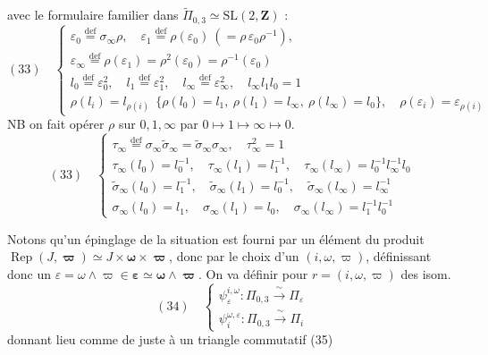 \documentclass[11pt,a4paper]{article}
\begin{document}
avec le formulaire familier dans $\widetilde{\Pi}_{0,3} \simeq \mathrm{SL}(2,\mathbf{Z})$ :
\[
  (33)\quad
  \left\{
  \begin{array}{l}
    \varepsilon_0 \overset{\mathrm{def}}{=} \sigma_\infty \rho, \quad
    \varepsilon_1 \overset{\mathrm{def}}{=} \rho(\varepsilon_0)
      \ (= \rho\, \varepsilon_0 \rho^{-1}), \\[4pt]
    \varepsilon_\infty \overset{\mathrm{def}}{=} \rho(\varepsilon_1)
      = \rho^2(\varepsilon_0) = \rho^{-1}(\varepsilon_0) \\[4pt]
    l_0 \overset{\mathrm{def}}{=} \varepsilon_0^2, \quad
    l_1 \overset{\mathrm{def}}{=} \varepsilon_1^2, \quad
    l_\infty \overset{\mathrm{def}}{=} \varepsilon_\infty^2, \quad
    l_\infty l_1 l_0 = 1 \\[4pt]
    \rho(l_i) = l_{\rho(i)}
      \ \ \{\rho(l_0) = l_1,\ \rho(l_1) = l_\infty,\ \rho(l_\infty) = l_0\}, \quad
    \rho(\varepsilon_i) = \varepsilon_{\rho(i)}
  \end{array}
  \right.
\]
NB on fait opérer $\rho$ sur $0, 1, \infty$ par $0 \mapsto 1 \mapsto \infty \mapsto 0$.
\[
  (33)\quad
  \left\{
  \begin{array}{l}
    \tau_\infty \overset{\mathrm{def}}{=} \sigma_\infty \widetilde{\sigma}_\infty
      = \widetilde{\sigma}_\infty \sigma_\infty, \quad \tau_\infty^2 = 1 \\[4pt]
    \tau_\infty(l_0) = l_0^{-1}, \quad \tau_\infty(l_1) = l_1^{-1}, \quad
    \tau_\infty(l_\infty) = l_0^{-1} l_\infty^{-1} l_0 \\[4pt]
    \widetilde{\sigma}_\infty(l_0) = l_1^{-1}, \quad
    \widetilde{\sigma}_\infty(l_1) = l_0^{-1}, \quad
    \widetilde{\sigma}_\infty(l_\infty) = l_\infty^{-1} \\[4pt]
    \sigma_\infty(l_0) = l_1, \quad \sigma_\infty(l_1) = l_0, \quad
    \sigma_\infty(l_\infty) = l_1^{-1} l_0^{-1}
  \end{array}
  \right.
\]

Notons qu'un épinglage de la situation est fourni par un élément du produit
$\operatorname{Rep}(J, \boldsymbol{\varpi}) \simeq J \times \boldsymbol{\omega} \times \boldsymbol{\varpi}$,
donc par le choix d'un $(i, \omega, \varpi)$, définissant donc un
$\varepsilon = \omega \wedge \varpi \in \boldsymbol{\varepsilon} \simeq \boldsymbol{\omega} \wedge \boldsymbol{\varpi}$.
On va définir pour $r = (i, \omega, \varpi)$ des isom.
\[
  (34)\quad
  \left\{
  \begin{array}{l}
    \psi_\varepsilon^{i,\omega} : \Pi_{0,3} \xrightarrow{\ \sim\ } \Pi_\varepsilon \\[4pt]
    \psi_i^{\omega,\varepsilon} : \Pi_{0,3} \xrightarrow{\ \sim\ } \Pi_i
  \end{array}
  \right.
\]
donnant lieu comme de juste à un triangle commutatif (35)
\end{document}
